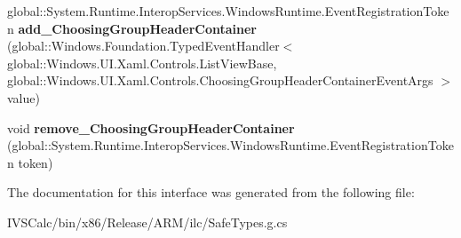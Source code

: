 \begin{DoxyCompactItemize}
\item 
\mbox{\label{interface_windows_1_1_u_i_1_1_xaml_1_1_controls_1_1_i_list_view_base4_a676b16cd7663b4ae45652525cdbe9e66}} 
global\+::\+System.\+Runtime.\+Interop\+Services.\+Windows\+Runtime.\+Event\+Registration\+Token {\bfseries add\+\_\+\+Choosing\+Group\+Header\+Container} (global\+::\+Windows.\+Foundation.\+Typed\+Event\+Handler$<$ global\+::\+Windows.\+U\+I.\+Xaml.\+Controls.\+List\+View\+Base, global\+::\+Windows.\+U\+I.\+Xaml.\+Controls.\+Choosing\+Group\+Header\+Container\+Event\+Args $>$ value)
\item 
\mbox{\label{interface_windows_1_1_u_i_1_1_xaml_1_1_controls_1_1_i_list_view_base4_acbca9310b039930aacfa0158b9dd0a63}} 
void {\bfseries remove\+\_\+\+Choosing\+Group\+Header\+Container} (global\+::\+System.\+Runtime.\+Interop\+Services.\+Windows\+Runtime.\+Event\+Registration\+Token token)
\end{DoxyCompactItemize}


The documentation for this interface was generated from the following file\+:\begin{DoxyCompactItemize}
\item 
I\+V\+S\+Calc/bin/x86/\+Release/\+A\+R\+M/ilc/Safe\+Types.\+g.\+cs\end{DoxyCompactItemize}

